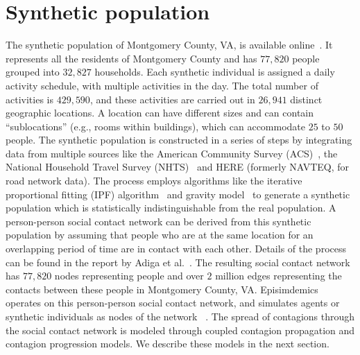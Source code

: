 \documentclass[doublespace]{VTthesis}
\begin{document}
    \section{Synthetic population}
    The synthetic population of Montgomery County, VA, is available online~\cite{synthPop2009Montva}. It represents all the residents of Montgomery County and has $77,820$ people grouped into $32,827$ households. Each synthetic individual is assigned a daily activity schedule, with multiple activities in the day. The total number of activities is $429,590$, and these activities are carried out in $26,941$ distinct geographic locations. A location can have different sizes and can contain ``sublocations'' (e.g., rooms within buildings), which can accommodate $25$ to $50$ people. The synthetic population is constructed in a series of steps by integrating data from multiple sources like the American Community Survey (ACS)~\cite{mather2005american}, the National Household Travel Survey (NHTS)~\cite{NHTS11} and HERE (formerly NAVTEQ, for road network data). The process employs algorithms like the iterative proportional fitting (IPF) algorithm~\cite{BBM96} and gravity model~\cite{erlander90gravityModel} to generate a synthetic population which is statistically indistinguishable from the real population. A person-person social contact network can be derived from this synthetic population by assuming that people who are at the same location for an overlapping period of time are in contact with each other. Details of the process can be found in the report by Adiga et al.~\cite{adiga15US}. The resulting social contact network has $77,820$ nodes representing people and over $2$ million edges representing the contacts between these people in Montgomery County, VA. Episimdemics operates on this person-person social contact network, and simulates agents or synthetic individuals as nodes of the network ~\cite{swarup14challenge}. The spread of contagions through the social contact network is modeled through coupled contagion propagation and contagion progression models. We describe these models in the next section.
    
\end{document}
